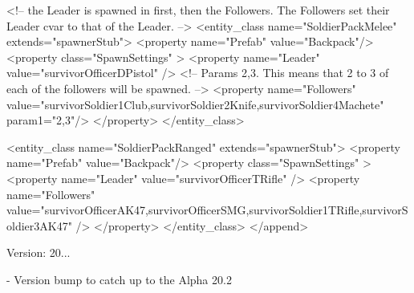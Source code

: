 \begin{DoxyVerb}
        <!-- the Leader is spawned in first, then the Followers. The Followers set their Leader cvar to that of the Leader. -->
        <entity_class name="SoldierPackMelee" extends="spawnerStub">
            <property name="Prefab" value="Backpack"/>
            <property class="SpawnSettings" >
            <property name="Leader" value="survivorOfficerDPistol" />
            <!-- Params 2,3. This means that 2 to 3 of each of the followers will be spawned. -->
            <property name="Followers" value="survivorSoldier1Club,survivorSoldier2Knife,survivorSoldier4Machete" param1="2,3"/>
            </property>
        </entity_class>

        <entity_class name="SoldierPackRanged" extends="spawnerStub">
            <property name="Prefab" value="Backpack"/>
            <property class="SpawnSettings" >
            <property name="Leader" value="survivorOfficerTRifle" />
            <property name="Followers" value="survivorOfficerAK47,survivorOfficerSMG,survivorSoldier1TRifle,survivorSoldier3AK47" />
            </property>
        </entity_class>
    </append>
\end{DoxyVerb}
 Version\+: 20... \begin{DoxyVerb}- Version bump to catch up to the Alpha 20.2
\end{DoxyVerb}
